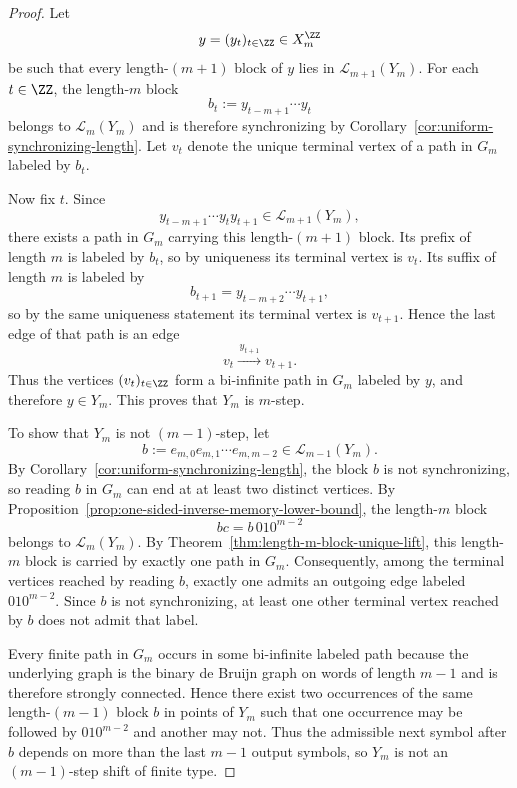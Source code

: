 \begin{proof}
Let
\[
y=(y_t)_{t\in\ZZ}\in X_m^{\ZZ}
\]
be such that every length-$(m+1)$ block of $y$ lies in
$\mathcal L_{m+1}(Y_m)$.  For each $t\in\ZZ$, the length-$m$ block
\[
b_t:=y_{t-m+1}\cdots y_t
\]
belongs to $\mathcal L_m(Y_m)$ and is therefore synchronizing by
Corollary~\ref{cor:uniform-synchronizing-length}.  Let $v_t$ denote the unique
terminal vertex of a path in $G_m$ labeled by $b_t$.

Now fix $t$.  Since
\[
y_{t-m+1}\cdots y_ty_{t+1}\in\mathcal L_{m+1}(Y_m),
\]
there exists a path in $G_m$ carrying this length-$(m+1)$ block.  Its prefix
of length $m$ is labeled by $b_t$, so by uniqueness its terminal vertex is
$v_t$.  Its suffix of length $m$ is labeled by
\[
b_{t+1}=y_{t-m+2}\cdots y_{t+1},
\]
so by the same uniqueness statement its terminal vertex is $v_{t+1}$.  Hence
the last edge of that path is an edge
\[
v_t\xrightarrow{\,y_{t+1}\,}v_{t+1}.
\]
Thus the vertices $(v_t)_{t\in\ZZ}$ form a bi-infinite path in $G_m$ labeled by
$y$, and therefore $y\in Y_m$.  This proves that $Y_m$ is $m$-step.

To show that $Y_m$ is not $(m-1)$-step, let
\[
b:=e_{m,0}e_{m,1}\cdots e_{m,m-2}\in\mathcal L_{m-1}(Y_m).
\]
By Corollary~\ref{cor:uniform-synchronizing-length}, the block $b$ is not
synchronizing, so reading $b$ in $G_m$ can end at at least two distinct
vertices.  By Proposition~\ref{prop:one-sided-inverse-memory-lower-bound}, the
length-$m$ block
\[
bc=b\,010^{m-2}
\]
belongs to $\mathcal L_m(Y_m)$.  By
Theorem~\ref{thm:length-m-block-unique-lift}, this length-$m$ block is carried
by exactly one path in $G_m$.  Consequently, among the terminal vertices
reached by reading $b$, exactly one admits an outgoing edge labeled
$010^{m-2}$.  Since $b$ is not synchronizing, at least one other terminal
vertex reached by $b$ does not admit that label.

Every finite path in $G_m$ occurs in some bi-infinite labeled path because the
underlying graph is the binary de Bruijn graph on words of length $m-1$ and is
therefore strongly connected.  Hence there exist two occurrences of the same
length-$(m-1)$ block $b$ in points of $Y_m$ such that one occurrence may be
followed by $010^{m-2}$ and another may not.  Thus the admissible next symbol
after $b$ depends on more than the last $m-1$ output symbols, so $Y_m$ is not
an $(m-1)$-step shift of finite type.
\end{proof}

